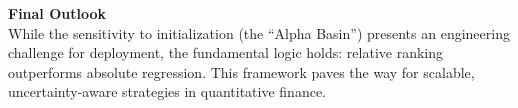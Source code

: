 \documentclass[twoside,final]{hcmut-report}
\begin{document}
\textbf{Final Outlook} \\
While the sensitivity to initialization (the ``Alpha Basin'') presents an engineering challenge for deployment, the fundamental logic holds: relative ranking outperforms absolute regression. This framework paves the way for scalable, uncertainty-aware strategies in quantitative finance.




\end{document}
